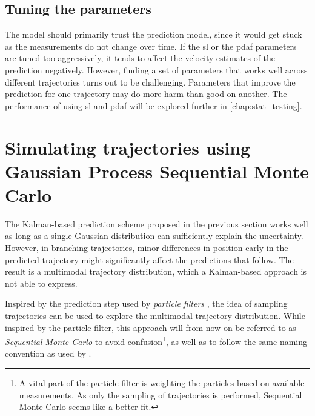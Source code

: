 \subsection{Tuning the parameters}
The model should primarily trust the prediction model, since it would get stuck as the measurements do not change over time. If the \acrshort{sl} or the \acrshort{pdaf} parameters are tuned too aggressively, it tends to affect the velocity estimates of the prediction negatively. However, finding a set of parameters that works well across different trajectories turns out to be challenging. Parameters that improve the prediction for one trajectory may do more harm than good on another. The performance of using \acrshort{sl} and \acrshort{pdaf} will be explored further in \cref{chap:stat_testing}.


\section{Simulating trajectories using Gaussian Process Sequential Monte Carlo}\label{sec:dyngp_particle}
The Kalman-based prediction scheme proposed in the previous section works well as long as a single Gaussian distribution can sufficiently explain the uncertainty. However, in branching trajectories, minor differences in position early in the predicted trajectory might significantly affect the predictions that follow. The result is a multimodal trajectory distribution, which a Kalman-based approach is not able to express.

Inspired by the prediction step used by \textit{particle filters} \cite{sensorfusjon}, the idea of sampling trajectories can be used to explore the multimodal trajectory distribution. While inspired by the particle filter, this approach will from now on be referred to as \textit{Sequential Monte-Carlo} to avoid confusion\footnote{A vital part of the particle filter is weighting the particles based on available measurements. As only the sampling of trajectories is performed, Sequential Monte-Carlo seems like a better fit.}, as well as to follow the same naming convention as used by \citeauthor{pedestrian} \cite{pedestrian}.

